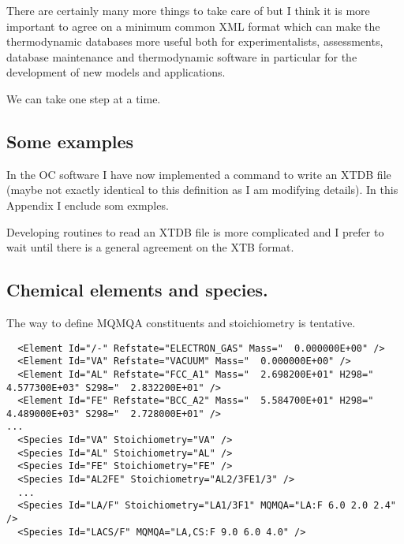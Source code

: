 \documentclass{article}
\begin{document}
There are certainly many more things to take care of but I think it is
more important to agree on a minimum common XML format which can make
the thermodynamic databases more useful both for experimentalists,
assessments, database maintenance and thermodynamic software in
particular for the development of new models and applications.

We can take one step at a time.

\newpage 

\newpage
\begin{appendices}
\setcounter{equation}{0}
\renewcommand{\theequation}{A\arabic{equation}}
\setcounter{figure}{0}
\renewcommand{\thefigure}{A\arabic{figure}}

\section{Some examples}\label{sec:examples}

In the OC software I have now implemented a command to write an XTDB
file (maybe not exactly identical to this definition as I am modifying
details).  In this Appendix I enclude som exmples.

Developing routines to read an XTDB file is more complicated and I
prefer to wait until there is a general agreement on the XTB format.

\subsection{Chemical elements and species.}\label{sec:elementexample}

The way to define MQMQA constituents and stoichiometry is tentative.

{\small
\begin{verbatim}
  <Element Id="/-" Refstate="ELECTRON_GAS" Mass="  0.000000E+00" />
  <Element Id="VA" Refstate="VACUUM" Mass="  0.000000E+00" />
  <Element Id="AL" Refstate="FCC_A1" Mass="  2.698200E+01" H298="  4.577300E+03" S298="  2.832200E+01" />
  <Element Id="FE" Refstate="BCC_A2" Mass="  5.584700E+01" H298="  4.489000E+03" S298="  2.728000E+01" />
...
  <Species Id="VA" Stoichiometry="VA" />
  <Species Id="AL" Stoichiometry="AL" />
  <Species Id="FE" Stoichiometry="FE" />
  <Species Id="AL2FE" Stoichiometry="AL2/3FE1/3" />
  ...
  <Species Id="LA/F" Stoichiometry="LA1/3F1" MQMQA="LA:F 6.0 2.0 2.4" />
  <Species Id="LACS/F" MQMQA="LA,CS:F 9.0 6.0 4.0" />
\end{verbatim}
}


\end{appendices}
\end{document}

